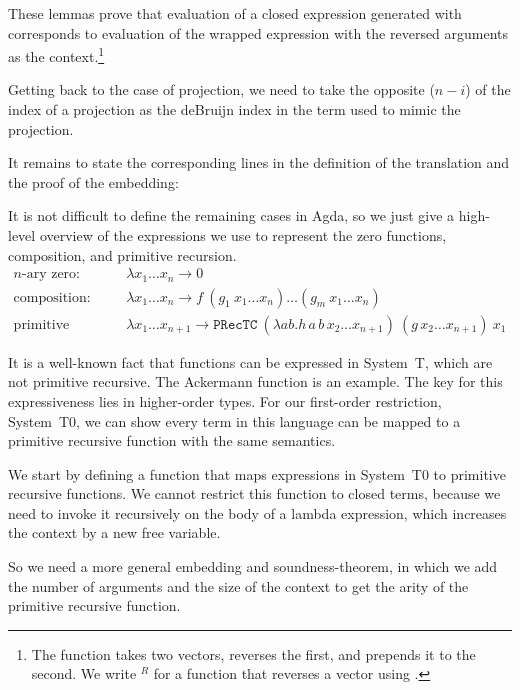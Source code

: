 \documentclass{jfp}
\newcommand{\xs}[1]{x_1\dots x_{#1}}
\begin{document}



These lemmas prove that evaluation of a closed expression generated with
 corresponds to evaluation of the wrapped
expression with the reversed arguments as the context.\footnote{
The function  takes two vectors, reverses the first,
and prepends it to the second. We write $^R$ for a function that
reverses a vector using .
}

Getting back to the case of projection, we need to take the opposite ($n - i$) of the index of a
projection as the deBruijn index in the term used to mimic the projection.

\mkProj

\lookupOpRev

It remains to state the corresponding lines in the definition of the
translation and the proof of the embedding:
\prToStProj
\embedPRSTSoundProj

It is not difficult to define the remaining cases in Agda, so we just
give a high-level overview of the expressions we use to represent the zero functions, composition, and primitive recursion.
\begin{align*}
  \text{$n$-ary zero: } & \lambda \xs{n} \rightarrow 0 \\
  \text{composition: } & \lambda \xs{n} \rightarrow  f \ (g_1 \ \xs{n})
                        \dots (g_m \ \xs{n}) \\
  \text{primitive recursion: } & \lambda \xs{n+1} \rightarrow \mathtt{PRecTC} \ (\lambda a b . h \, a \, b \, x_2 \dots x_{n+1}) \ (g \, x_2 \dots x_{n+1}) \ x_1 
\end{align*}


It is a well-known fact that functions can be expressed in System~T,
which are not primitive recursive. The Ackermann function is an
example. The key for this expressiveness lies in higher-order
types. For our first-order restriction, System~T0, we can show every
term in this language can be mapped to a primitive recursive function
with the same semantics.  

We start by defining a function that maps expressions in System~T0 to primitive recursive functions.
We cannot restrict this function to closed terms, because we need to
invoke it recursively on the body of a lambda expression, which
increases the context by a new free variable.  


So we need a more general embedding and soundness-theorem, in which we
add the number of arguments and the size of the context to get the
arity of the primitive recursive function. 
\end{document}

